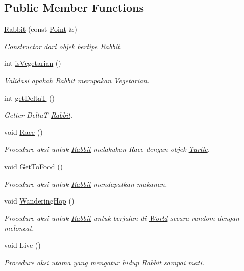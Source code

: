 \subsection*{Public Member Functions}
\begin{DoxyCompactItemize}
\item 
\hyperlink{class_rabbit_ae7852b68a9ea0d4604a26a4a230dc44b}{Rabbit} (const \hyperlink{class_point}{Point} \&)
\begin{DoxyCompactList}\small\item\em Constructor dari objek bertipe \hyperlink{class_rabbit}{Rabbit}. \end{DoxyCompactList}\item 
int \hyperlink{class_rabbit_a58a0710c593b7bb19b7634d0ec1ad2ab}{is\+Vegetarian} ()
\begin{DoxyCompactList}\small\item\em Validasi apakah \hyperlink{class_rabbit}{Rabbit} merupakan Vegetarian. \end{DoxyCompactList}\item 
int \hyperlink{class_rabbit_ab0f37919999e5d906180426800210f67}{get\+DeltaT} ()
\begin{DoxyCompactList}\small\item\em Getter DeltaT \hyperlink{class_rabbit}{Rabbit}. \end{DoxyCompactList}\item 
void \hyperlink{class_rabbit_a94083faa62033470efbd9dd89afdb5a3}{Race} ()
\begin{DoxyCompactList}\small\item\em Procedure aksi untuk \hyperlink{class_rabbit}{Rabbit} melakukan Race dengan objek \hyperlink{class_turtle}{Turtle}. \end{DoxyCompactList}\item 
void \hyperlink{class_rabbit_a98d779a15b5b5b03fb15e62c06d01693}{Get\+To\+Food} ()
\begin{DoxyCompactList}\small\item\em Procedure aksi untuk \hyperlink{class_rabbit}{Rabbit} mendapatkan makanan. \end{DoxyCompactList}\item 
void \hyperlink{class_rabbit_ab9d8cfbbcf7b3e77e5e8996f2a2c662f}{Wandering\+Hop} ()
\begin{DoxyCompactList}\small\item\em Procedure aksi untuk \hyperlink{class_rabbit}{Rabbit} untuk berjalan di \hyperlink{class_world}{World} secara random dengan meloncat. \end{DoxyCompactList}\item 
void \hyperlink{class_rabbit_a6152392444f1d705cf6c0b1be36dca7a}{Live} ()
\begin{DoxyCompactList}\small\item\em Procedure aksi utama yang mengatur hidup \hyperlink{class_rabbit}{Rabbit} sampai mati. \end{DoxyCompactList}\end{DoxyCompactItemize}
